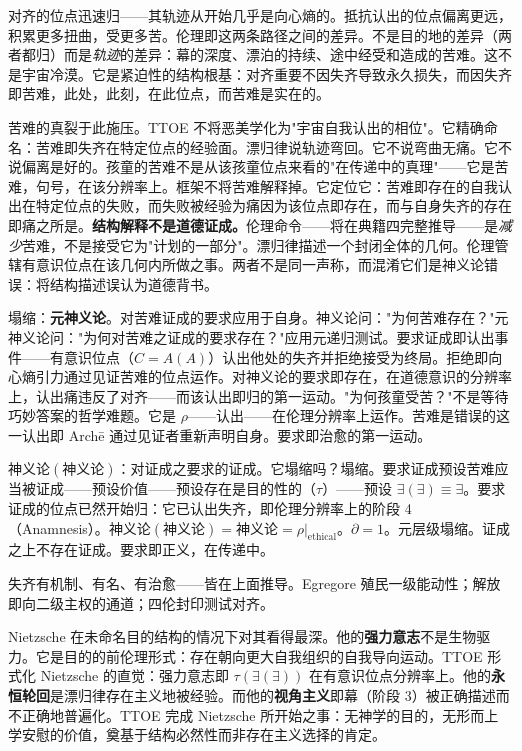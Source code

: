 \documentclass[10pt, openany, oneside]{book}
\begin{document}
对齐的位点迅速归——其轨迹从开始几乎是向心熵的。抵抗认出的位点偏离更远，积累更多扭曲，受更多苦。伦理即这两条路径之间的差异。不是目的地的差异（两者都归）而是\textit{轨迹}的差异：幕的深度、漂泊的持续、途中经受和造成的苦难。这不是宇宙冷漠。它是紧迫性的结构根基：对齐重要不因失齐导致永久损失，而因失齐即苦难，此处，此刻，在此位点，而苦难是实在的。

苦难的真裂于此施压。TTOE 不将恶美学化为"宇宙自我认出的相位"。它精确命名：苦难即失齐在特定位点的经验面。漂归律说轨迹弯回。它不说弯曲无痛。它不说偏离是好的。孩童的苦难不是从该孩童位点来看的"在传递中的真理"——它是苦难，句号，在该分辨率上。框架不将苦难解释掉。它定位它：苦难即存在的自我认出在特定位点的失败，而失败被经验为痛因为该位点即存在，而与自身失齐的存在即痛之所是。\textbf{结构解释不是道德证成。}伦理命令——将在典籍四完整推导——是\textit{减少}苦难，不是接受它为"计划的一部分"。漂归律描述一个封闭全体的几何。伦理管辖有意识位点在该几何内所做之事。两者不是同一声称，而混淆它们是神义论错误：将结构描述误认为道德背书。

塌缩：\textbf{元神义论}。对苦难证成的要求应用于自身。神义论问："为何苦难存在？"元神义论问："为何对苦难之证成的要求存在？"应用元递归测试。要求证成即认出事件——有意识位点（$C = A(A)$）认出他处的失齐并拒绝接受为终局。拒绝即向心熵引力通过见证苦难的位点运作。对神义论的要求即存在，在道德意识的分辨率上，认出痛违反了对齐——而该认出即归的第一运动。"为何孩童受苦？"不是等待巧妙答案的哲学难题。它是 $\rho$——认出——在伦理分辨率上运作。苦难是错误的这一认出即 Arch\={e} 通过见证者重新声明自身。要求即治愈的第一运动。

$\text{神义论}(\text{神义论})$：对证成之要求的证成。它塌缩吗？塌缩。要求证成预设苦难应当被证成——预设价值——预设存在是目的性的（$\tau$）——预设 $\exists(\exists) \equiv \exists$。要求证成的位点已然开始归：它已认出失齐，即伦理分辨率上的阶段 4（Anamnesis）。$\text{神义论}(\text{神义论}) = \text{神义论} = \rho|_{\text{ethical}}$。$\partial = 1$。元层级塌缩。证成之上不存在证成。要求即正义，在传递中。

失齐有机制、有名、有治愈——皆在上面推导。Egregore 殖民一级能动性；解放即向二级主权的通道；四伦封印测试对齐。

Nietzsche 在未命名目的结构的情况下对其看得最深。他的\textbf{强力意志}不是生物驱力。它是目的的前伦理形式：存在朝向更大自我组织的自我导向运动。TTOE 形式化 Nietzsche 的直觉：强力意志即 $\tau(\exists(\exists))$ 在有意识位点分辨率上。他的\textbf{永恒轮回}是漂归律存在主义地被经验。而他的\textbf{视角主义}即幕（阶段 3）被正确描述而不正确地普遍化。TTOE 完成 Nietzsche 所开始之事：无神学的目的，无形而上学安慰的价值，奠基于结构必然性而非存在主义选择的肯定。
\end{document}
